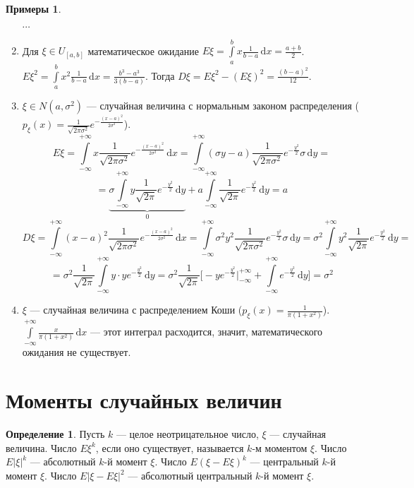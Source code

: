 \documentclass[11pt,openany,a4paper]{scrartcl}
\theoremstyle{plain}
\theoremstyle{definition}
\newtheorem{definition}[theorem]{Определение}
\newtheorem{examples}[theorem]{Примеры}
\newcommand{\dif}{\, \mathrm d}
\begin{document}
\begin{examples}
\begin{enumerate}
        $\cdots$
        \item Для $\xi \in U_{[a,b]}$ математическое ожидание $E\xi =
        \int\limits_a^b x\frac{1}{b-a}\dif x = \frac{a + b}{2}$. $E\xi^2 =
        \int\limits_a^b x^2\frac{1}{b-a}\dif x = \frac{b^3 - a^3}{3(b-a)}$.
        Тогда $D\xi = E\xi^2 - (E\xi)^2 = \frac{(b-a)^2}{12}$.
        \item $\xi \in N(a, \sigma^2)$ — случайная величина с нормальным
        законом распределения ($p_\xi(x) =
        \frac{1}{\sqrt{2\pi\sigma^2}}e^{-\frac{(x-a)^2}{2\sigma^2}}$).
        $$
        E\xi = \int\limits_{-\infty}^{+\infty}x\frac{1}{\sqrt{2\pi\sigma^2}}
        e^{-\frac{(x-a)^2}{2\sigma^2}}\dif x =
        \int\limits_{-\infty}^{+\infty}
        (\sigma y - a)\frac{1}{\sqrt{2\pi\sigma^2}}
        e^{-\frac{y^2}{2}}\sigma\dif y =
        $$
        $$
        =\underbrace{\sigma \int\limits_{-\infty}^{+\infty}
        y\frac{1}{\sqrt{2\pi}}e^{-\frac{y^2}{2}} \dif y}_0 +
        a\int\limits_{-\infty}^{+\infty}
        \frac{1}{\sqrt{2\pi}}e^{-\frac{y^2}{2}} \dif y = a
        $$
        $$
        D\xi = \int\limits_{-\infty}^{+\infty}
        (x-a)^2\frac{1}{\sqrt{2\pi\sigma^2}}e^{-\frac{(x-a)^2}{2\sigma^2}} \dif x
        = \int\limits_{-\infty}^{+\infty}
        \sigma^2 y^2 \frac{1}{\sqrt{2\pi\sigma^2}}e^{-\frac{y^2}{2}}\sigma \dif y
        = \sigma^2 \int\limits_{-\infty}^{+\infty}
        y^2 \frac{1}{\sqrt{2\pi}}e^{-\frac{y^2}{2}}\dif y =
        $$
        $$
        = \sigma^2 \frac{1}{\sqrt{2\pi}} \int\limits_{-\infty}^{+\infty}
        y\cdot ye^{-\frac{y^2}{2}}\dif y = \sigma^2 \frac{1}{\sqrt{2\pi}}
        \bigg[ -ye^{-\frac{y^2}{2}}\bigg|_{-\infty}^{+\infty} +
        \int\limits_{-\infty}^{+\infty}e^{-\frac{y^2}{2}}\dif y\bigg] = \sigma^2
        $$
        \item $\xi$ — случайная величина с распределением Коши
        ($p_\xi(x) = \frac{1}{\pi(1 + x^2)}$).
        $\int\limits_{-\infty}^{+\infty} \frac{x}{\pi(1 + x^2)}\dif x$ — этот 
        интеграл расходится, значит, математического ожидания не существует.
    \end{enumerate}
\end{examples}

\section{Моменты случайных величин}

\begin{definition}
    Пусть $k$ — целое неотрицательное число, $\xi$ — случайная величина.
    Число $E\xi^k$, если оно существует, называется $k$-м моментом $\xi$.
    Число $E|\xi|^k$ — абсолютный $k$-й момент $\xi$.
    Число $E(\xi - E\xi)^k$ — центральный $k$-й момент $\xi$.
    Число $E|\xi - E\xi|^2$ — абсолютный центральный $k$-й момент $\xi$.
\end{definition}
\end{document}
